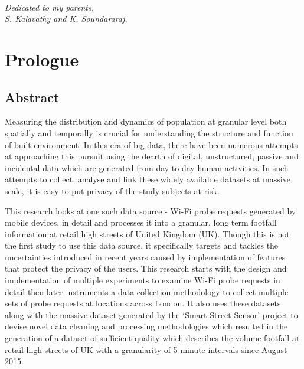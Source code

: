 
\cleardoublepage
~\vfill
\begin{doublespace}
\noindent\fontsize{12}{12}\selectfont\itshape \nohyphenation
\noindent Dedicated to my parents,\\
\noindent S. Kalavathy and K. Soundararaj.
\end{doublespace}
\vfill
\vfill

\chapter*{Prologue}

\section*{Abstract} 

Measuring the distribution and dynamics of population at granular level both spatially and temporally is crucial for understanding the structure and function of built environment.
In this era of big data, there have been numerous attempts at approaching this pursuit using the dearth of digital, unstructured, passive and incidental data which are generated from day to day human activities.
In such attempts to collect, analyse and link these widely available datasets at massive scale, it is easy to put privacy of the study subjects at risk.

This research looks at one such data source - Wi-Fi probe requests generated by mobile devices, in detail and processes it into a granular, long term footfall information at retail high streets of United Kingdom (UK).
Though this is not the first study to use this data source, it specifically targets and tackles the uncertainties introduced in recent years caused by implementation of features that protect the privacy of the users.
This research starts with the design and implementation of multiple experiments to examine Wi-Fi probe requests in detail then later instruments a data collection methodology to collect multiple sets of probe requests at locations across London.
It also uses these datasets along with the massive dataset generated by the `Smart Street Sensor' project to devise novel data cleaning and processing methodologies which resulted in the generation of a dataset of sufficient quality which  describes the volume footfall at retail high streets of UK with a granularity of 5 minute intervals since August 2015.

